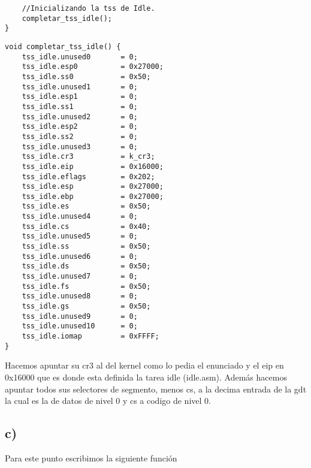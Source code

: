 \begin{codesnippet}
\begin{verbatim}
    //Inicializando la tss de Idle.
    completar_tss_idle();
}
\end{verbatim}
\end{codesnippet}



\begin{codesnippet}
\begin{verbatim}
void completar_tss_idle() {
    tss_idle.unused0       = 0;
    tss_idle.esp0          = 0x27000;
    tss_idle.ss0           = 0x50;
    tss_idle.unused1       = 0;
    tss_idle.esp1          = 0;
    tss_idle.ss1           = 0;
    tss_idle.unused2       = 0;
    tss_idle.esp2          = 0;
    tss_idle.ss2           = 0;
    tss_idle.unused3       = 0;
    tss_idle.cr3           = k_cr3;
    tss_idle.eip           = 0x16000;
    tss_idle.eflags        = 0x202;
    tss_idle.esp           = 0x27000;
    tss_idle.ebp           = 0x27000;
    tss_idle.es            = 0x50;
    tss_idle.unused4       = 0;
    tss_idle.cs            = 0x40;
    tss_idle.unused5       = 0;
    tss_idle.ss            = 0x50;
    tss_idle.unused6       = 0;
    tss_idle.ds            = 0x50;
    tss_idle.unused7       = 0;
    tss_idle.fs            = 0x50;
    tss_idle.unused8       = 0;
    tss_idle.gs            = 0x50;
    tss_idle.unused9       = 0;
    tss_idle.unused10      = 0;
    tss_idle.iomap         = 0xFFFF;
}
\end{verbatim}
\end{codesnippet}

Hacemos apuntar su cr3 al del kernel como lo pedia el enunciado y el eip en 0x16000 que es donde esta definida la tarea idle (idle.asm). Además hacemos apuntar todos sus selectores de segmento, menos cs,
 a la decima entrada de la gdt la cual es la de datos de nivel 0 y cs a codigo de nivel 0. 

\newpage 

 \subsection*{c)}
 Para este punto escribimos la siguiente función

